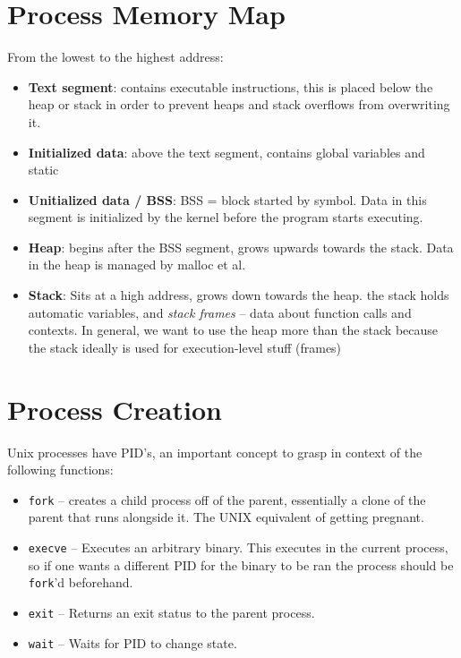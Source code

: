 \section{Process Memory Map}

From the lowest to the highest address:
\begin{itemize}
\item \textbf{Text segment}: contains executable instructions, this is placed
  below the heap or stack in order to prevent heaps and stack overflows from
  overwriting it.
\item \textbf{Initialized data}: above the text segment, contains global
  variables and static 
\item \textbf{Unitialized data / BSS}: BSS = block started by symbol. Data in
  this segment is initialized by the kernel before the program starts executing.
\item \textbf{Heap}: begins after the BSS segment, grows upwards towards the
  stack. Data in the heap is managed by malloc et al.
\item \textbf{Stack}: Sits at a high address, grows down towards the heap. the
  stack holds automatic variables, and \textit{stack frames} -- data about
  function calls and contexts. In general, we want to use the heap more than the
  stack because the stack ideally is used for execution-level stuff (frames)
\end{itemize}


\section{Process Creation}
Unix processes have PID's, an important concept to grasp in context of the
following functions:
\begin{itemize}
\item \texttt{fork}   -- creates a child process off of the parent, essentially
  a clone of the parent that runs alongside it. The UNIX equivalent of getting pregnant.
\item \texttt{execve} -- Executes an arbitrary binary. This executes in the
  current process, so if one wants a different PID for the binary to be ran the
  process should be \texttt{fork}'d beforehand.
\item \texttt{exit}   -- Returns an exit status to the parent process.
\item \texttt{wait}   -- Waits for PID to change state.
\end{itemize}

